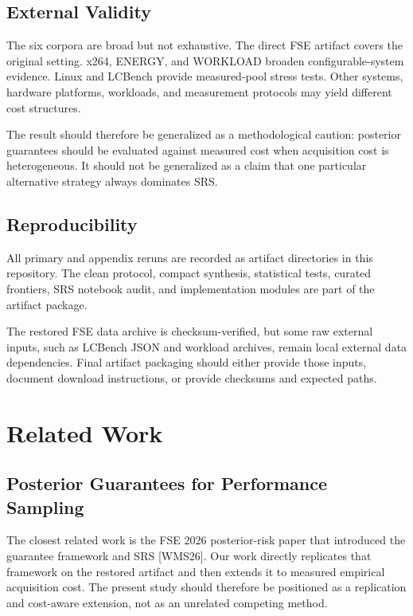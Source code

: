 \documentclass[smallcondensed]{svjour3}
\begin{document}
\subsection{External Validity}\label{external-validity}

The six corpora are broad but not exhaustive. The direct FSE artifact
covers the original setting. x264, ENERGY, and WORKLOAD broaden
configurable-system evidence. Linux and LCBench provide measured-pool
stress tests. Other systems, hardware platforms, workloads, and
measurement protocols may yield different cost structures.

The result should therefore be generalized as a methodological caution:
posterior guarantees should be evaluated against measured cost when
acquisition cost is heterogeneous. It should not be generalized as a
claim that one particular alternative strategy always dominates SRS.

\subsection{Reproducibility}\label{reproducibility}

All primary and appendix reruns are recorded as artifact directories in
this repository. The clean protocol, compact synthesis, statistical
tests, curated frontiers, SRS notebook audit, and implementation modules
are part of the artifact package.

The restored FSE data archive is checksum-verified, but some raw
external inputs, such as LCBench JSON and workload archives, remain
local external data dependencies. Final artifact packaging should either
provide those inputs, document download instructions, or provide
checksums and expected paths.

\section{Related Work}\label{related-work}

\subsection{Posterior Guarantees for Performance
Sampling}\label{posterior-guarantees-for-performance-sampling}

The closest related work is the FSE 2026 posterior-risk paper that
introduced the guarantee framework and SRS {[}WMS26{]}. Our work
directly replicates that framework on the restored artifact and then
extends it to measured empirical acquisition cost. The present study
should therefore be positioned as a replication and cost-aware
extension, not as an unrelated competing method.
\end{document}
